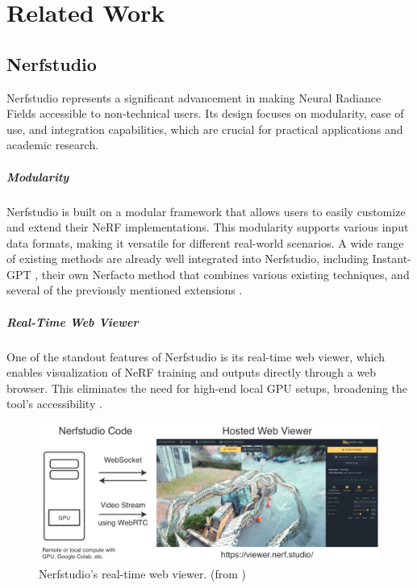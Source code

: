 %
\chapter{Related Work}
\label{sec:related}

\section{Nerfstudio}
\label{sec:related:nerfstudio}

Nerfstudio \cite{tancik_nerfstudio_2023} represents a significant advancement in making Neural Radiance Fields accessible to non-technical users.
Its design focuses on modularity, ease of use, and integration capabilities, which are crucial for practical applications and academic research.

\paragraph{Modularity}
Nerfstudio is built on a modular framework that allows users to easily customize and extend their NeRF implementations.
This modularity supports various input data formats, making it versatile for different real-world scenarios.
A wide range of existing methods are already well integrated into Nerfstudio, including Instant-GPT \cite{muller_instant_2022}, their own Nerfacto \cite{noauthor_nerfacto_nodate} method that combines various existing techniques, and several of the previously mentioned extensions \cite{haque_instruct-nerf2nerf_2023,jan-niklas_dihlmann_signerf_2024}.

\paragraph{Real-Time Web Viewer}
One of the standout features of Nerfstudio is its real-time web viewer, which enables visualization of NeRF training and outputs directly through a web browser.
This eliminates the need for high-end local GPU setups, broadening the tool's accessibility \cite{noauthor_nerfstudio-projectviser_2024}.

\begin{figure}[h!]
  \centering
  \includegraphics[width=\textwidth]{figures/related-nerfstudio-viewer.png}
  \caption{Nerfstudio's real-time web viewer. (from \cite{tancik_nerfstudio_2023})}
  \label{fig:nerfstudio-viewer}
\end{figure}


